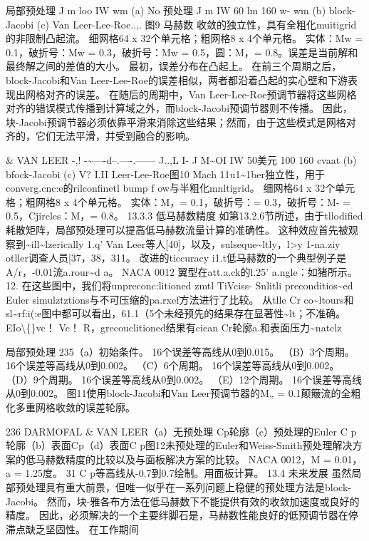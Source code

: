 \documentclass[UTF8,11pt,a4paper,openany,fontset=fandol]{ctexbook}
\begin{document}
局部预处理 J m loo IW wm (a) No 预处理 J m IW 60 lm 160 w- wm (b) block-Jacobi (c) Van Leer-Lee-Roe..,. 图9 马赫数 收敛的独立性，具有全粗化muitigrid的非限制凸起流。 细网格64 x 32个单元格；粗网格8 x 4个单元格。 实体：Mw = 0.1，破折号：Mw = 0.3，破折号：Mw = 0.5，圆：M，= 0.8。误差是当前解和最终解之间的差值的大小。 最初，误差分布在凸起上。 在前三个周期之后，block-Jacobi和Van Leer-Lee-Roe的误差相似，两者都沿着凸起的实心壁和下游表现出网格对齐的误差。 在随后的周期中，Van Leer-Lee-Roe预调节器将这些网格对齐的错误模式传播到计算域之外，而block-Jacobi预调节器则不传播。 因此，块-Jacobi预调节器必须依靠平滑来消除这些结果；然而，由于这些模式是网格对齐的，它们无法平滑，并受到融合的影响。

\& VAN LEER -,! -\textasciitilde{}----d--.----.------ J..,L I- J M\textasciitilde{}OI IW 50美元 100 160 cvaat (b) bfock-Jacobi (c) V? I.II Leer-Lee-Roe图10 Mach 11u1\textasciitilde{}1ber独立性，用于converg.cnc:e的rilconfinetl bump f ow与半粗化mnltigrid。 细网格64 x 32个单元格；粗网格8 x 4个单元格。 实体：M，= 0.1，破折号：= 0.3，破折号：M- = 0.5，Cjircles：M，= 0.8。 13.3.3 低马赫数精度 如第13.2.6节所述，由于tllodified耗散矩阵，局部预处理可以提高低马赫数流量计算的准确性。 这种效应首先被观察到\textasciitilde{}ill\textasciitilde{}lzerically 1.q' Van Leer等人[40]，以及，sulseque\textasciitilde{}ltly，l>y 1-na.ziy otller调查人员[37，38，311。 改进的ticcuracy i1.t低马赫数的一个典型例子是A/r，-0.01流a.rour\textasciitilde{}d a。 NACA 0012 翼型在att.a.ck的l.25' a.ngle：如猪所示。 12. 在这些图中，我们将unpreconc:litioned zmtl TiVciss- Snlitli preconditios\textasciitilde{}ed Euler simulztztions与不可压缩的pa.rxef方法进行了比较。 从tlle Cr co\textasciitilde{}ltours和sl\textasciitilde{}rf:i(:e图中都可以看出，61.1（5个未经预先的结果存在显著性\textasciitilde{}lt；不准确。 EIo\textbackslash\{\}vc！ Vc！ R，grecouclitioned结果有ciean Cr轮廓a.和表面压力\textasciitilde{}natclz

局部预处理 235（a）初始条件。 16个误差等高线从0到0.015。 （B）3个周期。 16个误差等高线从0到0.002。 （C）6个周期。 16个误差等高线从0到0.002。 （D）9个周期。 16个误差等高线从0到0.002。 （E）12个周期。 16个误差等高线从0到0.002。 图11使用block-Jacobi和Van Leer预调节器的M„ = 0.1颠簸流的全粗化多重网格收敛的误差轮廓。

236 DARMOFAL \& VAN LEER（a）无预处理 Cp轮廓（c）预处理的Euler C p轮廓（b）表面Cp（d）表面C p图12未预处理的Euler和Weiss-Smith预处理解决方案的低马赫数精度的比较以及与面板解决方案的比较。 NACA 0012，M = 0.01，a = 1.25度。 31 C p等高线从-0.7到0.7绘制。用面板计算。 13.4 未来发展 虽然局部预处理具有重大前景，但唯一似乎在一系列问题上稳健的预处理方法是block-Jacobi。 然而，块-雅各布方法在低马赫数下不能提供有效的收敛加速度或良好的精度。 因此，必须解决的一个主要绊脚石是，马赫数性能良好的低预调节器在停滞点缺乏坚固性。 在工作期间
\end{document}
